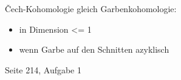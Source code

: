 \documentclass{uebblatt}
\begin{document}

Čech-Kohomologie gleich Garbenkohomologie:
\begin{itemize}
\item in Dimension <= 1
\item wenn Garbe auf den Schnitten azyklisch
\end{itemize}

Seite 214, Aufgabe 1
\end{document}
